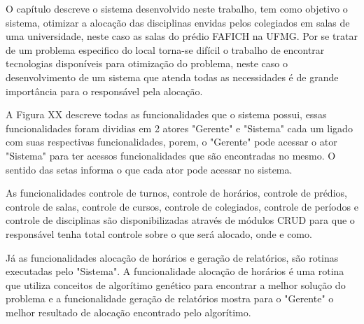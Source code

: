 \documentclass{abntpuc}
\begin{document}
%
%
%
%
%


\iniciocapitulo
O capítulo descreve o sistema desenvolvido neste trabalho, tem como objetivo o sistema, otimizar a alocação das disciplinas envidas pelos colegiados em salas de uma universidade, neste caso as salas do prédio FAFICH na UFMG. Por se tratar de um problema especifico do local torna-se difícil o trabalho de encontrar tecnologias disponíveis para otimização do problema, neste caso o desenvolvimento de um sistema que atenda todas as necessidades é de grande importância para o responsável pela alocação.\par



A Figura XX descreve todas as funcionalidades que o sistema possui, essas funcionalidades foram dividias em 2 atores "Gerente" e "Sistema" cada um ligado com suas respectivas funcionalidades, porem, o "Gerente" pode acessar o ator "Sistema" para ter acessos funcionalidades que são encontradas no mesmo. O sentido das setas informa o que cada ator pode acessar no sistema.\par

As funcionalidades controle de turnos, controle de horários, controle de prédios, controle de salas, controle de cursos, controle de colegiados, controle de períodos e controle de disciplinas são disponibilizadas através de módulos CRUD para que o responsável tenha total controle sobre o que será alocado, onde e como.\par

Já as funcionalidades alocação de horários e geração de relatórios, são rotinas executadas pelo "Sistema". A funcionalidade alocação de horários é uma rotina que utiliza conceitos de algorítimo genético para encontrar a melhor solução do problema e a funcionalidade geração de relatórios mostra para o "Gerente" o melhor resultado de alocação encontrado pelo algorítimo.\par
\end{document}
